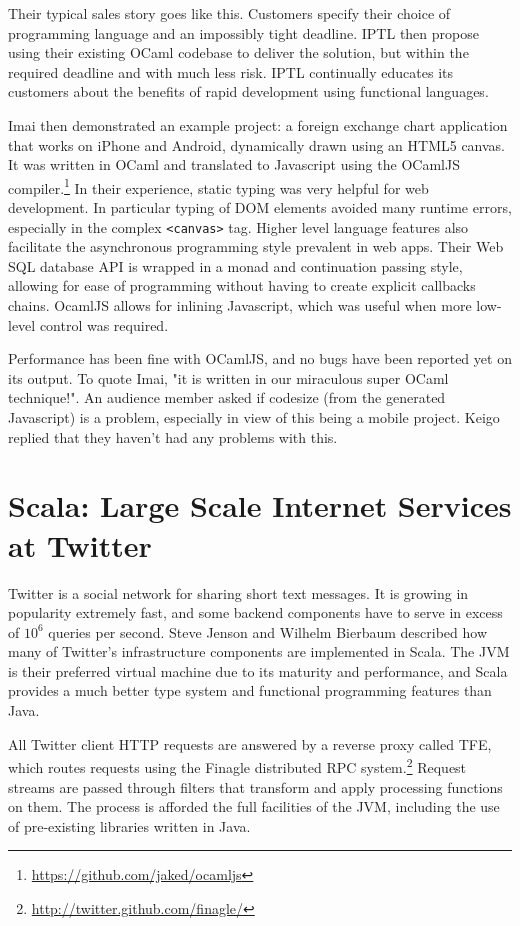 \documentclass{jfp1}
\begin{document}
Their typical sales story goes like this. Customers specify their choice of
programming language and an impossibly tight deadline.  IPTL then propose using
their existing OCaml codebase to deliver the solution, but within the required
deadline and with much less risk.  IPTL continually educates its customers
about the benefits of rapid development using functional languages.

Imai then demonstrated an example project: a foreign exchange chart application
that works on iPhone and Android, dynamically drawn using an HTML5 canvas.  It
was written in OCaml and translated to Javascript using the OCamlJS
compiler.\footnote{\url{https://github.com/jaked/ocamljs}}  In their
experience, static typing was very helpful for web development.  In particular
typing of DOM elements avoided many runtime errors, especially in the complex
{\tt <canvas>} tag.  Higher level language features also facilitate the
asynchronous programming style prevalent in web apps.  Their Web SQL database
API is wrapped in a monad and continuation passing style, allowing
for ease of programming without having to create explicit callbacks chains.
OcamlJS allows for inlining Javascript, which was useful when more low-level
control was required.

Performance has been fine with OCamlJS, and no bugs have been reported yet on
its output. To quote Imai, "it is written in our miraculous super OCaml
technique!". An audience member asked if codesize (from the generated
Javascript) is a problem, especially in view of this being a mobile project.
Keigo replied that they haven't had any problems with this.

\section{Scala: Large Scale Internet Services at Twitter}

Twitter is a social network for sharing short text messages. It is growing in
popularity extremely fast, and some backend components have to serve in excess
of $10^6$ queries per second.  Steve Jenson and Wilhelm Bierbaum described how
many of Twitter's infrastructure components are implemented in Scala.  The JVM
is their preferred virtual machine due to its maturity and performance, and Scala
provides a much better type system and functional programming features than
Java.

All Twitter client HTTP requests are answered by a reverse proxy called TFE,
which routes requests using the Finagle distributed RPC
system.\footnote{\url{http://twitter.github.com/finagle/}} Request streams are
passed through filters that transform and apply processing functions on them.
The process is afforded the full facilities of the JVM, including the use of
pre-existing libraries written in Java.
\end{document}
